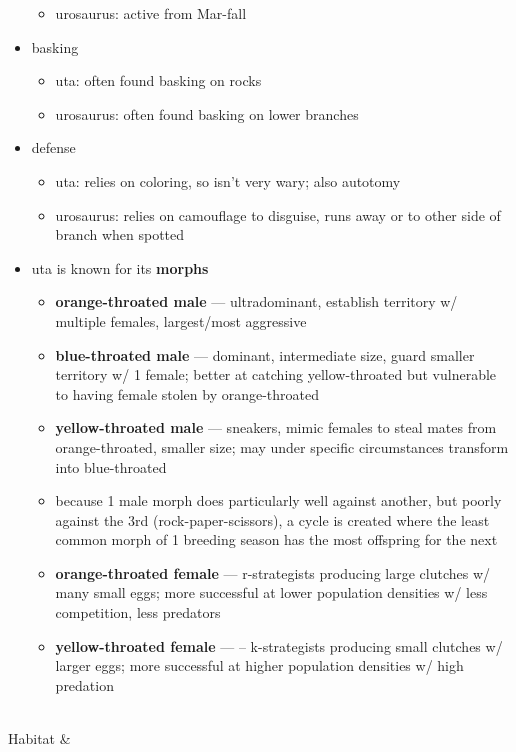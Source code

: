 \begin{center}
\begin{longtabu}
\begin{itemize}[noitemsep]
\begin{itemize}[noitemsep]
				\item urosaurus: active from Mar-fall
			\end{itemize}
		\item basking
			\begin{itemize}[noitemsep]
				\item uta: often found basking on rocks
				\item urosaurus: often found basking on lower branches
			\end{itemize}
		\item defense
			\begin{itemize}[noitemsep]
				\item uta: relies on coloring, so isn’t very wary; also autotomy
				\item urosaurus: relies on camouflage to disguise, runs away or to other side of branch when spotted
			\end{itemize}
		\item uta is known for its \textbf{morphs}
			\begin{itemize}[noitemsep]
				\item \textbf{orange-throated male} --- ultradominant, establish territory w/ multiple females, largest/most aggressive
				\item \textbf{blue-throated male} --- dominant, intermediate size, guard smaller territory w/ 1 female; better at catching yellow-throated but vulnerable to having female stolen by orange-throated
				\item \textbf{yellow-throated male} --- sneakers, mimic females to steal mates from orange-throated, smaller size; may under specific circumstances transform into blue-throated
				\item because 1 male morph does particularly well against another, but poorly against the 3rd (rock-paper-scissors), a cycle is created where the least common morph of 1 breeding season has the most offspring for the next
				\item \textbf{orange-throated female} --- r-strategists producing large clutches w/ many small eggs; more successful at lower population densities w/ less competition, less predators
				\item \textbf{yellow-throated female} --- – k-strategists producing small clutches w/ larger eggs; more successful at higher population densities w/ high predation
			\end{itemize}
	\end{itemize}
	\\
	\hline
	Habitat & 

\end{longtabu}
\end{center}
